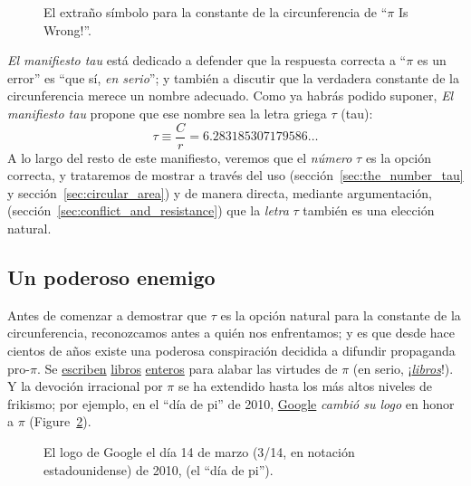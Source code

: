 \begin{figure}
\caption{El extraño símbolo para la constante de la circunferencia de ``$\pi$ Is Wrong!''.\label{fig:palais_tau}}
\end{figure}

\emph{El manifiesto tau} está dedicado a defender que la respuesta correcta a ``$\pi$ es un error'' es ``que sí, \emph{en serio}''; y también a discutir que la verdadera constante de la circunferencia merece un nombre adecuado. Como ya habrás podido suponer, \emph{El manifiesto tau} propone que ese nombre sea la letra griega $\tau$ (tau):
\begin{equation}
\label{eq:tau}
\tau \equiv \frac{C}{r} = 6.283185307179586\ldots
\end{equation}
A lo largo del resto de este manifiesto, veremos que el \emph{número} $\tau$ es la opción correcta, y trataremos de mostrar a través del uso (sección~\ref{sec:the_number_tau} y sección~\ref{sec:circular_area}) y de manera directa, mediante argumentación, (sección~\ref{sec:conflict_and_resistance}) que la  \emph{letra} $\tau$ también es una elección natural.

\subsection{Un poderoso enemigo} %
 \label{sec:a_powerful_enemy}

Antes de comenzar a demostrar que $\tau$ es la opción natural para la constante de la circunferencia, reconozcamos antes a quién nos enfrentamos; y es que desde hace cientos de años existe una poderosa conspiración decidida a difundir propaganda pro-$\pi$. Se  \href{http://www.amazon.com/exec/obidos/ISBN=0802713327/parallaxproductiA/}{escriben} \href{http://www.amazon.com/Pi-Sky-Counting-Thinking-Being/dp/0198539568}{libros} \href{http://www.amazon.com/exec/obidos/ISBN=0312381859/parallaxproductiA/}{enteros} para alabar las virtudes de $\pi$ (en serio, ¡\href{http://www.amazon.com/exec/obidos/ISBN=0387989463/parallaxproductiA/}{\emph{libros}}!). Y la devoción irracional por  $\pi$ se ha extendido hasta los más altos niveles de frikismo; por ejemplo, en el ``día de pi'' de 2010, \href{http://www.google.com/}{Google} \emph{cambió su logo} en honor a $\pi$ (Figure~\ref{fig:google_pi_day.}).

\begin{figure}
\begin{center}
\end{center}
\caption{El logo de Google el día 14 de marzo (3/14, en notación estadounidense)
de 2010, (el ``día de pi'').\label{fig:google_pi_day.}}
\end{figure}


